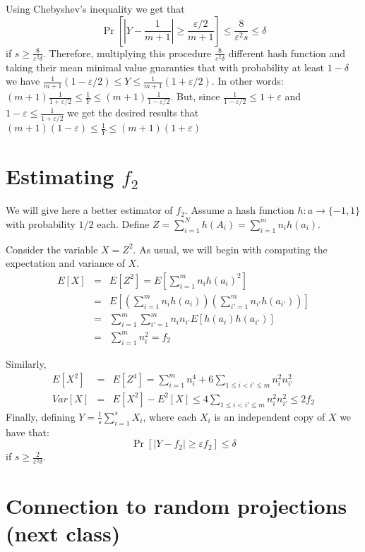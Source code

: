 \documentclass{article}
\newcommand{\eps}{\varepsilon}
\begin{document}
Using Chebyshev's inequality we get that 
\[
\Pr[|Y - \frac{1}{m+1}| \ge \frac{\eps/2}{m+1}] \le \frac{8}{\eps^2 s} \le \delta
\] 
if $s \ge \frac{8}{\eps^2 \delta}$. Therefore, multiplying this procedure $\frac{8}{\eps^2 \delta}$ different 
hash function and taking their mean minimal value guaranties that with probability at least $1-\delta$ we have
$\frac{1}{m+1}(1-\eps/2) \le Y \le \frac{1}{m+1}(1+\eps/2)$.
In other words: $(m+1)\frac{1}{1+\eps/2} \le \frac{1}{Y} \le (m+1)\frac{1}{1-\eps/2}$.
But, since $\frac{1}{1-\eps/2} \le 1+ \eps$ and $1- \eps \le \frac{1}{1+\eps/2}$ we get the desired results
that $(m+1)(1-\eps) \le \frac{1}{Y} \le (m+1)(1+\eps)$



\section*{Estimating $f_2$}

We will give here a better estimator of $f_2$.
Assume a hash function $h:a\rightarrow \{-1,1\}$ with probability $1/2$ each.
Define $Z = \sum_{i=1}^{N}h(A_i) = \sum_{i=1}^{m}n_i h(a_i)$.

Consider the variable $X = Z^2$. As usual, we will begin with computing the expectation and variance of $X$.
\begin{eqnarray*}
E[X] &=& E[Z^2] = E[\sum_{i=1}^{m}n_i h(a_i)^2]\\
&=& E[(\sum_{i=1}^{m}n_i h(a_i))(\sum_{i'=1}^{m}n_{i'} h(a_{i'}))]\\
&=& \sum_{i=1}^{m}\sum_{i'=1}^{m}n_i n_{i'} E[h(a_{i}) h(a_{i'})]\\
&=& \sum_{i=1}^{m} n_{i}^{2} = f_2
\end{eqnarray*}
 
Similarly,
\begin{eqnarray*}
E[X^2] &=& E[Z^4] = \sum_{i=1}^{m} n_{i}^{4} + 6\sum_{1\le i < i' \le m} n_{i}^{2}n_{i'}^{2}\\
Var[X] &=& E[X^2] - E^2[X] \le 4\sum_{1\le i < i' \le m} n_{i}^{2}n_{i'}^{2} \le 2f_2
\end{eqnarray*}
Finally, defining $Y = \frac{1}{s}\sum_{i=1}^{s}X_i$, where each $X_i$ is an independent copy of $X$ we have that:
\[
\Pr[|Y -f_2| \ge \eps f_2] \le \delta
\]
if $s \ge \frac{2}{\eps^2 \delta}$.

\section*{Connection to random projections (next class)}
  
\end{document}
